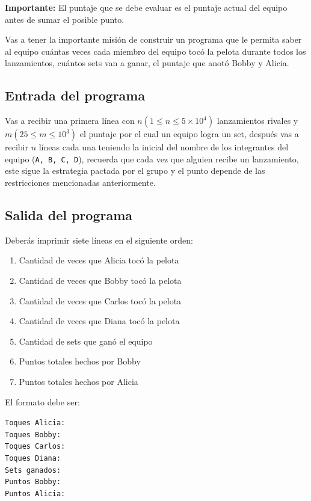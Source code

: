 \documentclass[11pt,a4paper]{article}
\begin{document}
\textbf{Importante:} El puntaje que se debe evaluar es el puntaje actual del equipo antes de sumar el posible punto.

Vas a tener la importante misión de construir un programa que le permita saber al equipo cuántas veces cada miembro del equipo tocó la pelota durante todos los lanzamientos, cuántos sets van a ganar, el puntaje que anotó Bobby y Alicia.

\subsection*{Entrada del programa}

Vas a recibir una primera línea con \(n (1 \leq n \leq 5\times10^4)\) lanzamientos rivales y \(m (25 \leq m \leq 10^3)\) el puntaje por el cual un equipo logra un set, después vas a recibir \(n\) líneas cada una teniendo la inicial del nombre de los integrantes del equipo (\texttt{A, B, C, D}), recuerda que cada vez que alguien recibe un lanzamiento, este sigue la estrategia pactada por el grupo y el punto depende de las restricciones mencionadas anteriormente.

\subsection*{Salida del programa}

Deberás imprimir siete líneas en el siguiente orden:
\begin{enumerate}
  \item Cantidad de veces que Alicia tocó la pelota
  \item Cantidad de veces que Bobby tocó la pelota
  \item Cantidad de veces que Carlos tocó la pelota
  \item Cantidad de veces que Diana tocó la pelota
  \item Cantidad de sets que ganó el equipo
  \item Puntos totales hechos por Bobby
  \item Puntos totales hechos por Alicia
\end{enumerate}

El formato debe ser:

\noindent\texttt{Toques Alicia:\\Toques Bobby:\\Toques Carlos:\\Toques Diana:\\Sets ganados:\\Puntos Bobby:\\Puntos Alicia:}
\end{document}

